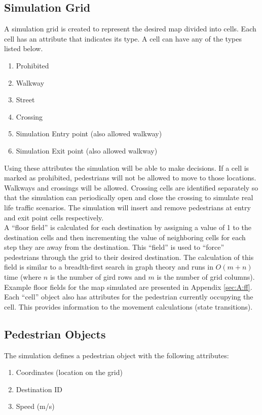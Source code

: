 \documentclass[paper=a4, fontsize=11pt]{scrartcl}
\numberwithin{equation}{section}		%
\numberwithin{figure}{section}			%
\numberwithin{table}{section}		    %
\begin{document}
\subsection{Simulation Grid} \label{sec:simgrid}
A simulation grid is created to represent the desired map divided into cells. Each cell has an 
attribute that indicates its type. A cell can have any of the types listed below.
\begin{enumerate}
	\item Prohibited
	\item Walkway
	\item Street
	\item Crossing
	\item Simulation Entry point (also allowed walkway)
	\item Simulation Exit point (also allowed walkway)
\end{enumerate}

\noindent
Using these attributes the simulation will be able to make decisions. If a cell is marked as 
prohibited, pedestrians will not be allowed to move to those locations. Walkways and crossings 
will be allowed. Crossing cells are identified separately so that the simulation can 
periodically open and close the crossing to simulate real life traffic scenarios. The 
simulation will insert and remove pedestrians at entry and exit point cells respectively.\\

\noindent
A ``floor field'' \cite{varas2007cellular} is calculated for each destination by assigning a 
value of 1 to the destination cells and then incrementing the value of neighboring cells for 
each step they are away from the destination. This ``field'' is used to ``force'' pedestrians 
through the grid to their desired destination. The calculation of this field is similar to a 
breadth-first search in graph theory and runs in $O(m+n)$ time (where $n$ is the number of gird 
rows and $m$ is the number of grid columns). Example floor fields for the map simulated are 
presented in Appendix \ref{sec:A:ff}.\\

\noindent
Each ``cell'' object also has attributes for the pedestrian currently occupying the cell. This 
provides information to the movement calculations (state transitions).

\subsection{Pedestrian Objects} \label{sec:simped}
The simulation defines a pedestrian object with the following attributes:
\begin{enumerate}
	\item Coordinates (location on the grid)
	\item Destination ID
	\item Speed (m/s)
\end{enumerate}
\end{document}
